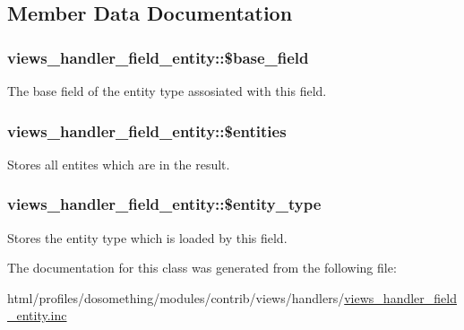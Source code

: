 \subsection{Member Data Documentation}
\hypertarget{classviews__handler__field__entity_a92d166179b1d040f2df11192d886ee0b}{
\subsubsection[{\$base\_\-field}]{\setlength{\rightskip}{0pt plus 5cm}views\_\-handler\_\-field\_\-entity::\$base\_\-field}}
\label{classviews__handler__field__entity_a92d166179b1d040f2df11192d886ee0b}
The base field of the entity type assosiated with this field. \hypertarget{classviews__handler__field__entity_af6a62be21b01390fdc7aa7f3b06525bc}{
\subsubsection[{\$entities}]{\setlength{\rightskip}{0pt plus 5cm}views\_\-handler\_\-field\_\-entity::\$entities}}
\label{classviews__handler__field__entity_af6a62be21b01390fdc7aa7f3b06525bc}
Stores all entites which are in the result. \hypertarget{classviews__handler__field__entity_a3cdc8356629cbdff0c796b221029f372}{
\subsubsection[{\$entity\_\-type}]{\setlength{\rightskip}{0pt plus 5cm}views\_\-handler\_\-field\_\-entity::\$entity\_\-type}}
\label{classviews__handler__field__entity_a3cdc8356629cbdff0c796b221029f372}
Stores the entity type which is loaded by this field. 

The documentation for this class was generated from the following file:\begin{DoxyCompactItemize}
\item 
html/profiles/dosomething/modules/contrib/views/handlers/\hyperlink{views__handler__field__entity_8inc}{views\_\-handler\_\-field\_\-entity.inc}\end{DoxyCompactItemize}
